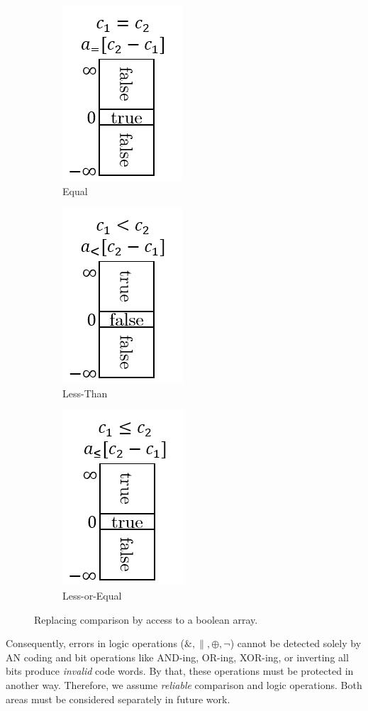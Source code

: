 \begin{figure}%
	\null\hfill
	\begin{subfigure}[t]{1in}
		\centering
		\includegraphics[width=.5in]{figures/ComparisonEquality.png}
		\caption{Equal}
		\label{fig:ANComparisonFix:Equal}
	\end{subfigure}
	\hfill
	\begin{subfigure}[t]{1in}
		\centering
		\includegraphics[width=.5in]{figures/ComparisonLessThan.png}
		\caption{Less-Than}
		\label{fig:ANComparisonFix:Less}
	\end{subfigure}
	\hfill
	\begin{subfigure}[t]{1in}
		\centering
		\includegraphics[width=.5in]{figures/ComparisonLessEqual.png}
		\caption{Less-or-Equal}
		\label{fig:ANComparisonFix:LessEqual}
	\end{subfigure}
	\hfill\null
	\vspace{-0.3cm}
	\caption{Replacing comparison by access to a boolean array.}%
	\label{fig:ANComparisonFix}%
	\vspace{-0.4cm}
\end{figure}


Consequently, errors in logic operations (\(\&, \|, \oplus, \neg\)) cannot be detected solely by AN coding and bit operations like AND-ing, OR-ing, XOR-ing, or inverting all bits produce \emph{invalid} code words. By that, these operations must be protected in another way. Therefore, we assume \emph{reliable} comparison and logic operations. Both areas must be considered separately in future work.

